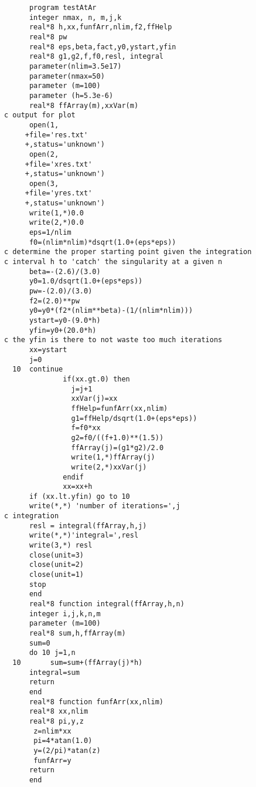 \documentclass{appolb}
\begin{document}
\begin{verbatim}
      program testAtAr
      integer nmax, n, m,j,k
      real*8 h,xx,funfArr,nlim,f2,ffHelp
      real*8 pw
      real*8 eps,beta,fact,y0,ystart,yfin
      real*8 g1,g2,f,f0,resl, integral
      parameter(nlim=3.5e17)
      parameter(nmax=50)
      parameter (m=100)
      parameter (h=5.3e-6)
      real*8 ffArray(m),xxVar(m)
c output for plot
      open(1,
     +file='res.txt'
     +,status='unknown')
      open(2,
     +file='xres.txt'
     +,status='unknown')
      open(3,
     +file='yres.txt'
     +,status='unknown')
      write(1,*)0.0
      write(2,*)0.0
      eps=1/nlim
      f0=(nlim*nlim)*dsqrt(1.0+(eps*eps))
c determine the proper starting point given the integration
c interval h to 'catch' the singularity at a given n
      beta=-(2.6)/(3.0)
      y0=1.0/dsqrt(1.0+(eps*eps))
      pw=-(2.0)/(3.0)
      f2=(2.0)**pw
      y0=y0*(f2*(nlim**beta)-(1/(nlim*nlim)))
      ystart=y0-(9.0*h)
      yfin=y0+(20.0*h)
c the yfin is there to not waste too much iterations 
      xx=ystart
      j=0
  10  continue
              if(xx.gt.0) then
                j=j+1
                xxVar(j)=xx
                ffHelp=funfArr(xx,nlim)
                g1=ffHelp/dsqrt(1.0+(eps*eps))
                f=f0*xx
                g2=f0/((f+1.0)**(1.5))
                ffArray(j)=(g1*g2)/2.0
                write(1,*)ffArray(j)
                write(2,*)xxVar(j)
              endif
              xx=xx+h
      if (xx.lt.yfin) go to 10
      write(*,*) 'number of iterations=',j
c integration  
      resl = integral(ffArray,h,j)
      write(*,*)'integral=',resl
      write(3,*) resl
      close(unit=3)
      close(unit=2)
      close(unit=1)
      stop
      end
      real*8 function integral(ffArray,h,n)
      integer i,j,k,n,m
      parameter (m=100)
      real*8 sum,h,ffArray(m)
      sum=0
      do 10 j=1,n
  10       sum=sum+(ffArray(j)*h)
      integral=sum
      return
      end
      real*8 function funfArr(xx,nlim)
      real*8 xx,nlim
      real*8 pi,y,z
       z=nlim*xx
       pi=4*atan(1.0)
       y=(2/pi)*atan(z)
       funfArr=y
      return
      end
\end{verbatim}
\end{document}
